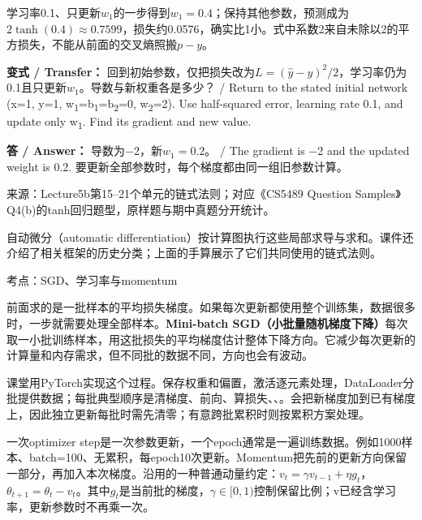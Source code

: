 学习率0.1、只更新\(w_1\)的一步得到\(w_1=0.4\)；保持其他参数，预测成为\(2\tanh(0.4)\approx0.7599\)，损失约0.0576，确实比1小。式中系数2来自未除以2的平方损失，不能从前面的交叉熵照搬\(p-y\)。


\textbf{变式 / Transfer：} 回到初始参数，仅把损失改为\(L=(\hat y-y)^2/2\)，学习率仍为0.1且只更新\(w_1\)。导数与新权重各是多少？ / Return to the stated initial network (x=1, y=1, w\textsubscript{1}=b\textsubscript{1}=b\textsubscript{2}=0, w\textsubscript{2}=2). Use half-squared error, learning rate 0.1, and update only w\textsubscript{1}. Find its gradient and new value.


\textbf{答 / Answer：} 导数为\ensuremath{-}2，新\(w_1=0.2\)。 / The gradient is \ensuremath{-}2 and the updated weight is 0.2. 要更新全部参数时，每个梯度都由同一组旧参数计算。


来源：Lecture5b第15–21个单元的链式法则；对应《CS5489 Question Samples》Q4(b)的tanh回归题型，原样题与期中真题分开统计。


自动微分（automatic differentiation）按计算图执行这些局部求导与求和。课件还介绍了相关框架的历史分类；上面的手算展示了它们共同使用的链式法则。








考点：SGD、学习率与momentum

前面求的是一批样本的平均损失梯度。如果每次更新都使用整个训练集，数据很多时，一步就需要处理全部样本。\textbf{Mini-batch SGD（小批量随机梯度下降）}每次取一小批训练样本，用这批损失的平均梯度估计整体下降方向。它减少每次更新的计算量和内存需求，但不同批的数据不同，方向也会有波动。


课堂用PyTorch实现这个过程。保存权重和偏置，激活逐元素处理，DataLoader分批提供数据；每批典型顺序是清梯度、前向、算损失、、。会把新梯度加到已有梯度上，因此独立更新每批时需先清零；有意跨批累积时则按累积方案处理。


一次optimizer step是一次参数更新，一个epoch通常是一遍训练数据。例如1000样本、batch=100、无累积，每epoch10次更新。Momentum把先前的更新方向保留一部分，再加入本次梯度。沿用的一种普通动量约定：\(v_t=\gamma v_{t-1}+\eta g_t\)，\(\theta_{t+1}=\theta_t-v_t\)。其中\(g_t\)是当前批的梯度，\(\gamma\in[0,1)\)控制保留比例；v已经含学习率，更新参数时不再乘一次。



